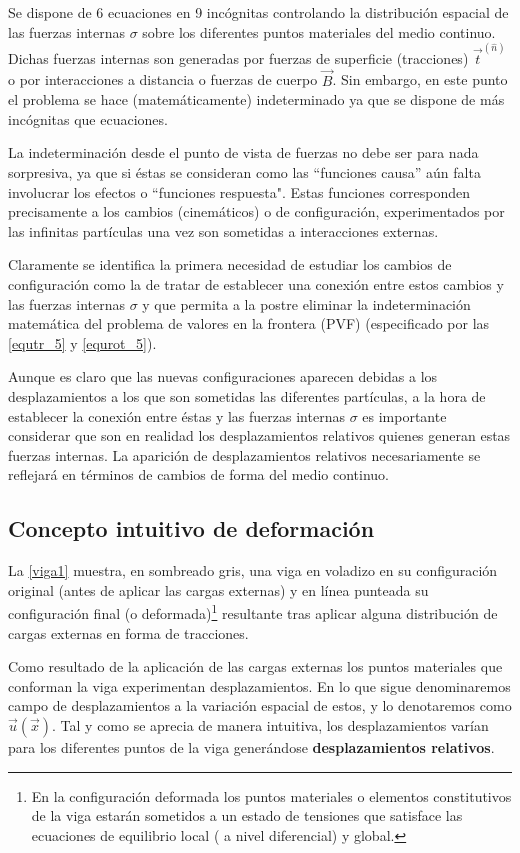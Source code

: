 \documentclass[../notas medios.tex]{subfiles}
\begin{document}
Se dispone de 6 ecuaciones en 9 incógnitas controlando la distribución espacial de las fuerzas internas $\sigma$ sobre los diferentes puntos materiales del medio continuo.  Dichas fuerzas internas son generadas por fuerzas de superficie (tracciones) $\vec{t}^{(\hat n)}$  o por interacciones a distancia o fuerzas de cuerpo $\vec {B}$.  Sin embargo, en este punto el problema se hace (matemáticamente) indeterminado ya que se dispone de más incógnitas que ecuaciones.

La indeterminación desde el punto de vista de fuerzas no debe ser para nada sorpresiva, ya que si éstas se consideran como las ``funciones causa'' aún falta involucrar los efectos o ``funciones respuesta". Estas funciones corresponden precisamente a los cambios (cinemáticos) o de configuración, experimentados por las infinitas partículas una vez son sometidas a interacciones externas.

Claramente se identifica la primera necesidad de estudiar los cambios de configuración como la de tratar de establecer una conexión entre estos cambios y las fuerzas internas $\sigma$ y que permita a la postre eliminar la indeterminación matemática del problema de valores en la frontera (PVF) (especificado por las \cref{equtr_5} y \cref{equrot_5}).

Aunque es claro que las nuevas configuraciones aparecen debidas a los desplazamientos a los que son sometidas las diferentes partículas, a la hora de establecer la conexión entre éstas y las fuerzas internas $\sigma$ es importante considerar que son en realidad los desplazamientos relativos  quienes generan estas fuerzas internas.  La aparición de desplazamientos relativos necesariamente se reflejará en términos de cambios de forma  del medio continuo.

\subsection{Concepto intuitivo de deformación}
La \cref{viga1} muestra, en sombreado gris, una viga en voladizo en su configuración original (antes de aplicar las cargas externas) y en línea punteada su configuración final (o deformada)\footnote{En la configuración deformada los puntos materiales o elementos constitutivos de la viga estarán sometidos a un estado de tensiones que satisface las ecuaciones de equilibrio local ( a nivel diferencial) y global.} resultante tras aplicar alguna distribución de cargas externas en forma de tracciones.

Como resultado de la aplicación de las cargas externas los puntos materiales 
que conforman la viga experimentan desplazamientos. En lo que sigue 
denominaremos campo de desplazamientos a la variación espacial de estos, y lo 
denotaremos como $\vec u(\vec x)$. Tal y como se aprecia de manera intuitiva, 
los desplazamientos varían para los diferentes puntos de la viga generándose 
\textbf{desplazamientos relativos}.
\end{document}
